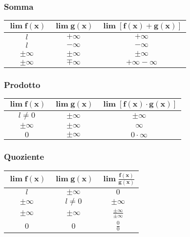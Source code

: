 \subsubsection{Somma}
\begin{center}
	\begin{tabular}{ccc}
		$\boldsymbol{\lim f(x)}$ & $\boldsymbol{\lim g(x)}$ & $\boldsymbol{\lim[f(x)+g(x)]}$\\\hline
		$l$ & $+\infty$ & $+\infty$\\
		$l$ & $-\infty$ & $-\infty$\\
		$\pm\infty$ & $\pm\infty$ & $\pm\infty$\\
		$\pm\infty$ & $\mp\infty$ & $\boxed{+\infty-\infty}$
	\end{tabular}
\end{center}

\subsubsection{Prodotto}
\begin{center}
	\begin{tabular}{ccc}
		$\boldsymbol{\lim f(x)}$ & $\boldsymbol{\lim g(x)}$ & $\boldsymbol{\lim[f(x)\cdot 
			g(x)]}$\\\hline
		$l\neq0$ & $\pm\infty$ & $\pm\infty$\\
		$\pm\infty$ & $\pm\infty$ & $\infty$\\
		$0$ & $\pm\infty$ & $\boxed{0\cdot\infty}$
	\end{tabular}
\end{center}

\subsubsection{Quoziente}
\begin{center}
	\begin{tabular}{ccc}
		$\boldsymbol{\lim f(x)}$ & $\boldsymbol{\lim g(x)}$ &
			$\boldsymbol{\lim\frac{f(x)}{g(x)}}$\\\hline
		$l$ & $\pm\infty$ & $0$\\
		$\pm\infty$ & $l\neq0$ & $\pm\infty$\\
		$\pm\infty$ & $\pm\infty$ & $\boxed{\frac{\pm\infty}{\pm\infty}}$\\
		$0$ & $0$ & $\boxed{\frac{0}{0}}$
	\end{tabular}
\end{center}

